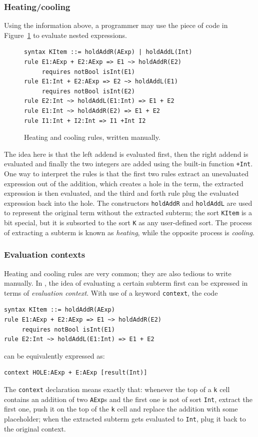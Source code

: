 \documentclass{fithesis3}
\begin{document}
\subsubsection{Heating/cooling}
Using the information above, a programmer may use the piece of \K code in Figure~\ref{manualHeatCool} to evaluate nested expressions.
\begin{figure}
\begin{lstlisting}
syntax KItem ::= holdAddR(AExp) | holdAddL(Int)
rule E1:AExp + E2:AExp => E1 ~> holdAddR(E2)
     requires notBool isInt(E1)
rule E1:Int + E2:AExp => E2 ~> holdAddL(E1)
     requires notBool isInt(E2)
rule E2:Int ~> holdAddL(E1:Int) => E1 + E2
rule E1:Int ~> holdAddR(E2) => E1 + E2
rule I1:Int + I2:Int => I1 +Int I2
\end{lstlisting}
\caption{Heating and cooling rules, written manually.}
\label{manualHeatCool}
\end{figure}
The idea here is that the left addend is evaluated first, then the right addend is evaluated and finally the two integers are added using the built-in function \texttt{+Int}. One way to interpret the rules is that the first two rules extract an unevaluated expression out of the addition, which creates a hole in the term, the extracted expression is then evaluated, and the third and forth rule plug the evaluated expression back into the hole. The constructors \texttt{holdAddR} and \texttt{holdAddL} are used to represent the original term without the extracted subterm; the sort \texttt{KItem} is a bit special, but it is subsorted to the sort \texttt{K} as any user-defined sort. The process of extracting a subterm is known as \textit{heating}, while the opposite process is \textit{cooling}. 

\subsubsection{Evaluation contexts}
Heating and cooling rules are very common; they are also tedious to write manually. In \K, the idea of evaluating a certain subterm first can be expressed in terms of \textit{evaluation context}. With use of a keyword \texttt{context}, the \K code
\begin{lstlisting}
syntax KItem ::= holdAddR(AExp)
rule E1:AExp + E2:AExp => E1 ~> holdAddR(E2)
     requires notBool isInt(E1)
rule E2:Int ~> holdAddL(E1:Int) => E1 + E2
\end{lstlisting}
can be equivalently expressed as:
\begin{lstlisting}
context HOLE:AExp + E:AExp [result(Int)]
\end{lstlisting}
The \texttt{context} declaration means exactly that: whenever the top of a \texttt{k} cell contains an addition of two \texttt{AExp}s and the first one is not of sort \texttt{Int}, extract the first one, push it on the top of the \texttt{k} cell and replace the addition with some placeholder; when the extracted subterm gets evaluated to \texttt{Int}, plug it back to the original context.
\end{document}
